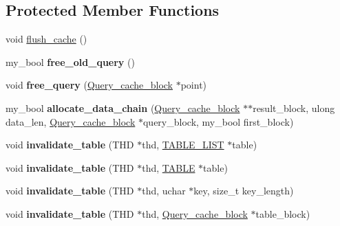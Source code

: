 \subsection*{Protected Member Functions}
\begin{DoxyCompactItemize}
\item 
void \mbox{\hyperlink{classQuery__cache_aee3618ded5824d751e181940cc42cb9c}{flush\+\_\+cache}} ()
\item 
\mbox{\label{classQuery__cache_a4f7ae04e310c4cc3cd948ea8b21ebcc9}} 
my\+\_\+bool {\bfseries free\+\_\+old\+\_\+query} ()
\item 
\mbox{\label{classQuery__cache_a4ecefee5736900dc4aedbb0aa6eb591d}} 
void {\bfseries free\+\_\+query} (\mbox{\hyperlink{structQuery__cache__block}{Query\+\_\+cache\+\_\+block}} $\ast$point)
\item 
\mbox{\label{classQuery__cache_a1528402a21759f956de650522e9a3eb8}} 
my\+\_\+bool {\bfseries allocate\+\_\+data\+\_\+chain} (\mbox{\hyperlink{structQuery__cache__block}{Query\+\_\+cache\+\_\+block}} $\ast$$\ast$result\+\_\+block, ulong data\+\_\+len, \mbox{\hyperlink{structQuery__cache__block}{Query\+\_\+cache\+\_\+block}} $\ast$query\+\_\+block, my\+\_\+bool first\+\_\+block)
\item 
\mbox{\label{classQuery__cache_aca4605d71c29bb3f92cee313cf0566e0}} 
void {\bfseries invalidate\+\_\+table} (T\+HD $\ast$thd, \mbox{\hyperlink{structTABLE__LIST}{T\+A\+B\+L\+E\+\_\+\+L\+I\+ST}} $\ast$table)
\item 
\mbox{\label{classQuery__cache_a5a2c04c44f6a79792706367975f293a4}} 
void {\bfseries invalidate\+\_\+table} (T\+HD $\ast$thd, \mbox{\hyperlink{structTABLE}{T\+A\+B\+LE}} $\ast$table)
\item 
\mbox{\label{classQuery__cache_a750176c9306dda6cd5c046109ced6d44}} 
void {\bfseries invalidate\+\_\+table} (T\+HD $\ast$thd, uchar $\ast$key, size\+\_\+t key\+\_\+length)
\item 
\mbox{\label{classQuery__cache_a979adb0f7e6f647495e26b1c8b4e20eb}} 
void {\bfseries invalidate\+\_\+table} (T\+HD $\ast$thd, \mbox{\hyperlink{structQuery__cache__block}{Query\+\_\+cache\+\_\+block}} $\ast$table\+\_\+block)
$$
\end{DoxyCompactItemize}
